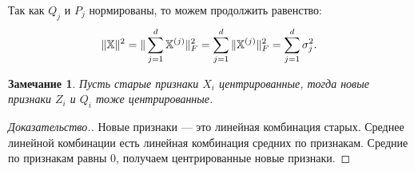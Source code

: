 \documentclass[specialist, 12pt,
subf, %
href, colorlinks=true,
substylefile = spbu.rtx,
]{disser}
\newtheorem{remark}{Замечание}
\begin{document}
Так как $Q_j$ и $P_j$ нормированы, то можем продолжить равенство:
\begin{gather*}
\Arrowvert\mathbb{X}\Arrowvert^2 = \Arrowvert\sum\limits_{j = 1}^d \mathbb{X}^{(j)}\Arrowvert^2_F = \sum\limits_{j = 1}^d\Arrowvert\mathbb{X}^{(j)}\Arrowvert^2_F = \sum\limits_{j = 1}^d \sigma_j^2.
\end{gather*}

\begin{remark}
	Пусть старые признаки $X_i$ центрированные, тогда новые признаки $Z_i$ и $Q_i$ тоже центрированные.
\end{remark}
\begin{proof}[Доказательство.]
	 Новые признаки --- это линейная комбинация старых. Среднее линейной комбинации есть линейная комбинация средних по признакам. Средние по признакам равны 0, получаем центрированные новые признаки.
\end{proof}
\end{document}
